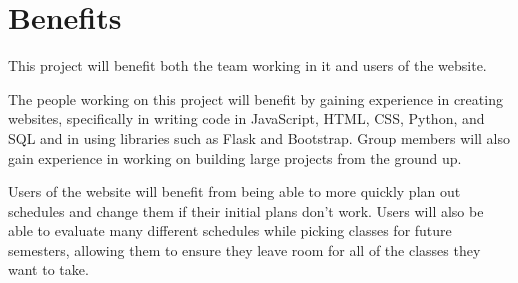 \section{Benefits}
This project will benefit both the team working in it and users of the website.

The people working on this project will benefit by gaining experience in
creating websites, specifically in writing code in JavaScript, HTML, CSS,
Python, and SQL and in using libraries such as Flask and Bootstrap.  Group
members will also gain experience in working on building large projects from the
ground up.

Users of the website will benefit from being able to more quickly plan out
schedules and change them if their initial plans don't work.  Users will also
be able to evaluate many different schedules while picking classes for future
semesters, allowing them to ensure they leave room for all of the classes they
want to take.

